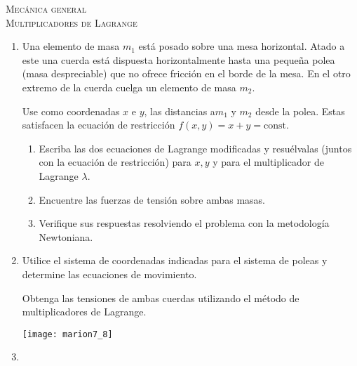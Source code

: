 \documentclass[11pt,spanish,a4paper]{article}
\begin{document}
\begin{center}
  \textsc{\large Mecánica general}\\
  \textsc{\large Multiplicadores de Lagrange}
\end{center}

\begin{enumerate}

\item 
Una elemento de masa \(m_1\) está posado sobre una mesa horizontal.
Atado a este una cuerda está dispuesta horizontalmente hasta una pequeña polea (masa despreciable) que no ofrece fricción en el borde de la mesa.
En el otro extremo de la cuerda cuelga un elemento de masa \(m_2\).

Use como coordenadas \(x\) e \(y\), las distancias a\(m_1\) y \(m_2\) desde la polea.
Estas satisfacen la ecuación de restricción \(f (x, y) = x + y = \mathrm{const}\).
\begin{enumerate}
\item Escriba las dos ecuaciones de Lagrange modificadas y resuélvalas (juntos con la ecuación de restricción) para \(x, y\) y para el multiplicador de Lagrange \(\lambda\).
\item Encuentre las fuerzas de tensión sobre ambas masas.
\item Verifique sus respuestas resolviendo el problema con la metodología Newtoniana.
\end{enumerate}


\item 
    \begin{minipage}[t][7.5cm]{0.55\textwidth}

Utilice el sistema de coordenadas indicadas para el sistema de poleas y determine las ecuaciones de movimiento.

Obtenga las tensiones de ambas cuerdas utilizando el método de multiplicadores de Lagrange.
    \end{minipage}
    \begin{minipage}[c][4cm][t]{0.4\textwidth}
        \texttt{[image: marion7\_8]}
    \end{minipage}


\item 
    \begin{minipage}[t][3cm]{0.65\textwidth}


\end{minipage}
\end{enumerate}
\end{document}
